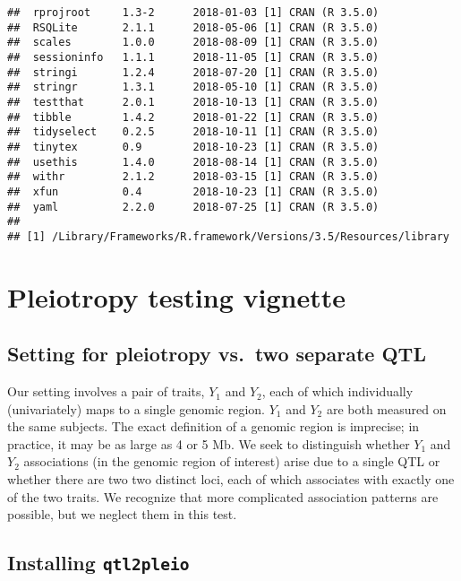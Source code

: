 \documentclass[oneside]{book}
\begin{document}
\begin{verbatim}
##  rprojroot     1.3-2      2018-01-03 [1] CRAN (R 3.5.0)                   
##  RSQLite       2.1.1      2018-05-06 [1] CRAN (R 3.5.0)                   
##  scales        1.0.0      2018-08-09 [1] CRAN (R 3.5.0)                   
##  sessioninfo   1.1.1      2018-11-05 [1] CRAN (R 3.5.0)                   
##  stringi       1.2.4      2018-07-20 [1] CRAN (R 3.5.0)                   
##  stringr       1.3.1      2018-05-10 [1] CRAN (R 3.5.0)                   
##  testthat      2.0.1      2018-10-13 [1] CRAN (R 3.5.0)                   
##  tibble        1.4.2      2018-01-22 [1] CRAN (R 3.5.0)                   
##  tidyselect    0.2.5      2018-10-11 [1] CRAN (R 3.5.0)                   
##  tinytex       0.9        2018-10-23 [1] CRAN (R 3.5.0)                   
##  usethis       1.4.0      2018-08-14 [1] CRAN (R 3.5.0)                   
##  withr         2.1.2      2018-03-15 [1] CRAN (R 3.5.0)                   
##  xfun          0.4        2018-10-23 [1] CRAN (R 3.5.0)                   
##  yaml          2.2.0      2018-07-25 [1] CRAN (R 3.5.0)                   
## 
## [1] /Library/Frameworks/R.framework/Versions/3.5/Resources/library
\end{verbatim}

\section{Pleiotropy testing vignette}

\hypertarget{setting-for-pleiotropy-vs.two-separate-qtl}{%
\subsection{Setting for pleiotropy vs.~two separate
QTL}\label{setting-for-pleiotropy-vs.two-separate-qtl}}

Our setting involves a pair of traits, \(Y_1\) and \(Y_2\), each of
which individually (univariately) maps to a single genomic region.
\(Y_1\) and \(Y_2\) are both measured on the same subjects. The exact
definition of a genomic region is imprecise; in practice, it may be as
large as 4 or 5 Mb. We seek to distinguish whether \(Y_1\) and \(Y_2\)
associations (in the genomic region of interest) arise due to a single
QTL or whether there are two two distinct loci, each of which associates
with exactly one of the two traits. We recognize that more complicated
association patterns are possible, but we neglect them in this test.

\hypertarget{installing-qtl2pleio}{%
\subsection{\texorpdfstring{Installing
\texttt{qtl2pleio}}{Installing qtl2pleio}}\label{installing-qtl2pleio}}
\end{document}
